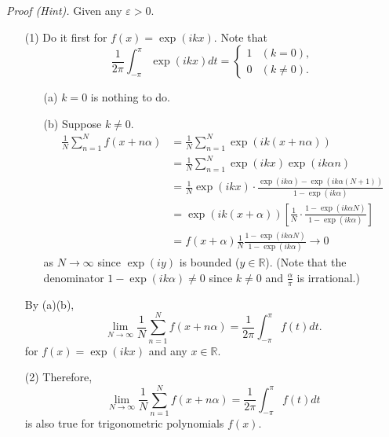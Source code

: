 \documentclass{article}
\begin{document}
\emph{Proof (Hint).}
Given any $\varepsilon > 0$.
\begin{enumerate}
\item[(1)]
Do it first for $f(x) = \exp(ikx)$.
Note that
\begin{equation*}
  \frac{1}{2\pi} \int_{-\pi}^{\pi}\exp(ikx)dt =
    \begin{cases}
      1 & (k = 0), \\
      0 & (k \neq 0).
    \end{cases}
\end{equation*}
  \begin{enumerate}
  \item[(a)]
    $k = 0$ is nothing to do.
  \item[(b)]
    Suppose $k \neq 0$.
    \begin{align*}
      \frac{1}{N} \sum_{n=1}^{N} f(x+n\alpha)
      &= \frac{1}{N} \sum_{n=1}^{N} \exp(ik(x+n\alpha)) \\
      &= \frac{1}{N} \sum_{n=1}^{N} \exp(ikx) \exp(ik\alpha n) \\
      &= \frac{1}{N} \exp(ikx) \cdot
        \frac{\exp(ik\alpha) - \exp(ik\alpha(N+1))}{1 - \exp(ik\alpha)} \\
      &= \exp(ik(x+\alpha)) \left[
        \frac{1}{N} \cdot \frac{1 - \exp(ik\alpha N)}{1 - \exp(ik\alpha)}
        \right] \\
      &= f(x+\alpha) \frac{1}{N} \frac{1 - \exp(ik\alpha N)}{1 - \exp(ik\alpha)} \to 0
    \end{align*}
    as $N \to \infty$ since $\exp(iy)$ is bounded ($y \in \mathbb{R}$).
    (Note that the denominator
    $1-\exp(ik\alpha) \neq 0$ since $k \neq 0$ and $\frac{\alpha}{\pi}$ is irrational.)
  \end{enumerate}
  By (a)(b),
  \[
    \lim_{N \to \infty} \frac{1}{N} \sum_{n=1}^{N} f(x+n\alpha)
    = \frac{1}{2\pi} \int_{-\pi}^{\pi} f(t) dt.
  \]
  for $f(x) = \exp(ikx)$ and any $x \in \mathbb{R}$.

\item[(2)]
Therefore,
\[
  \lim_{N \to \infty} \frac{1}{N} \sum_{n=1}^{N} f(x+n\alpha)
  = \frac{1}{2\pi} \int_{-\pi}^{\pi} f(t) dt
\]
is also true for trigonometric polynomials $f(x)$.


\end{enumerate}
\end{document}
